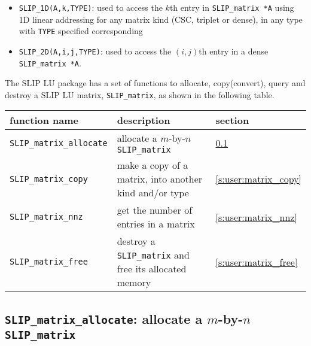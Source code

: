 \documentclass[12pt]{article}
\theoremstyle{definition}
\begin{document}
\begin{itemize}

\item
\verb|SLIP_1D(A,k,TYPE)|: used to access the $k$th entry in
                         \verb|SLIP_matrix *A| using 1D linear addressing for
                         any matrix kind (CSC, triplet or dense), in any type
                         with \verb|TYPE| specified corresponding

\item
\verb|SLIP_2D(A,i,j,TYPE)|: used to access the $(i,j)$th entry in a dense
                            \verb|SLIP_matrix *A|.

\end{itemize}

The SLIP LU package has a set of functions to allocate, copy(convert), query and
destroy a SLIP LU matrix, \verb|SLIP_matrix|, as shown in the following table.

{\small
\begin{center}
\begin{tabular}{lp{2.5in}l}
\hline
function name & description & section \\
\hline
\verb|SLIP_matrix_allocate|
    & allocate a $m$-by-$n$ \verb|SLIP_matrix|
    & \ref{s:user:matrix_allocate} \\
\hline
\verb|SLIP_matrix_copy|
    & make a copy of a matrix, into another kind and/or type
    & \ref{s:user:matrix_copy} \\
\hline
\verb|SLIP_matrix_nnz|
    & get the number of entries in a matrix
    & \ref{s:user:matrix_nnz} \\
\hline
\verb|SLIP_matrix_free|
    & destroy a \verb|SLIP_matrix| and free its allocated memory
    & \ref{s:user:matrix_free} \\
\hline
\end{tabular}
\end{center}
}

\newpage
\cprotect\subsection{\verb|SLIP_matrix_allocate|: allocate a $m$-by-$n$
\verb|SLIP_matrix|}
\label{s:user:matrix_allocate}
\end{document}
